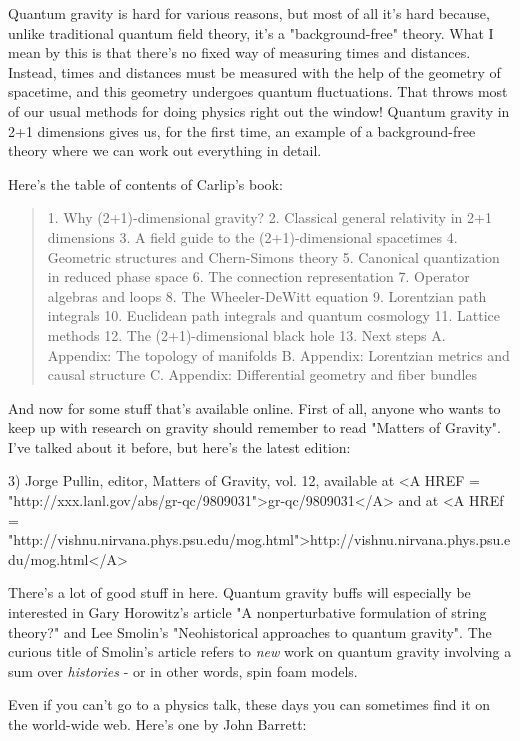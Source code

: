 Quantum gravity is hard for various reasons, but most of all it's hard
because, unlike traditional quantum field theory, it's a "background-free" 
theory.  What I mean by this is that there's no fixed way of measuring
times and distances.  Instead, times and distances must be measured with
the help of the geometry of spacetime, and this geometry undergoes
quantum fluctuations.  That throws most of our usual methods for doing
physics right out the window!  Quantum gravity in 2+1 dimensions gives
us, for the first time, an example of a background-free theory where we
can work out everything in detail.  

Here's the table of contents of Carlip's book:
\begin{quote}
 1. Why (2+1)-dimensional gravity?
 2. Classical general relativity in 2+1 dimensions
 3. A field guide to the (2+1)-dimensional spacetimes
 4. Geometric structures and Chern-Simons theory
 5. Canonical quantization in reduced phase space
 6. The connection representation
 7. Operator algebras and loops
 8. The Wheeler-DeWitt equation
 9. Lorentzian path integrals
10. Euclidean path integrals and quantum cosmology
11. Lattice methods
12. The (2+1)-dimensional black hole
13. Next steps
 A. Appendix: The topology of manifolds
 B. Appendix: Lorentzian metrics and causal structure
 C. Appendix: Differential geometry and fiber bundles

\end{quote}
    
And now for some stuff that's available online.   First of all, anyone
who wants to keep up with research on gravity should remember to read
"Matters of Gravity".  I've talked about it before, but here's the
latest edition:

3) Jorge Pullin, editor, Matters of Gravity, vol. 12, available at 
<A HREF = "http://xxx.lanl.gov/abs/gr-qc/9809031">gr-qc/9809031</A> and at
<A HREf = "http://vishnu.nirvana.phys.psu.edu/mog.html">http://vishnu.nirvana.phys.psu.edu/mog.html</A>


There's a lot of good stuff in here.  Quantum gravity buffs will
especially be interested in Gary Horowitz's article "A nonperturbative
formulation of string theory?" and Lee Smolin's "Neohistorical
approaches to quantum gravity".  The curious title of Smolin's article
refers to \emph{new} work on quantum gravity involving a sum over 
\emph{histories}
- or in other words, spin foam models.

Even if you can't go to a physics talk, these days you can sometimes 
find it on the world-wide web.  Here's one by John Barrett:

